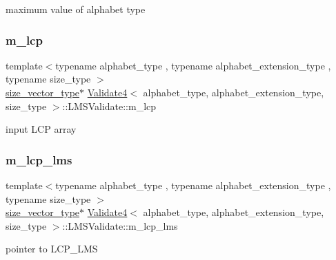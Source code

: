 maximum value of alphabet type 

\mbox{\label{struct_validate4_1_1_l_m_s_validate_a1618db621ffc7cc9265df07c08b58b93}} 
\subsubsection{\texorpdfstring{m\+\_\+lcp}{m\_lcp}}
{\footnotesize\ttfamily template$<$typename alphabet\+\_\+type , typename alphabet\+\_\+extension\+\_\+type , typename size\+\_\+type $>$ \\
\hyperlink{class_validate4_a46ea31a0a4b23f583806792160421d15}{size\+\_\+vector\+\_\+type}$\ast$ \hyperlink{class_validate4}{Validate4}$<$ alphabet\+\_\+type, alphabet\+\_\+extension\+\_\+type, size\+\_\+type $>$\+::L\+M\+S\+Validate\+::m\+\_\+lcp\hspace{0.3cm}{\ttfamily [private]}}



input L\+CP array 

\mbox{\label{struct_validate4_1_1_l_m_s_validate_a6ce0f5fd88cd24e81c85faad0c1d64d5}} 
\subsubsection{\texorpdfstring{m\+\_\+lcp\+\_\+lms}{m\_lcp\_lms}}
{\footnotesize\ttfamily template$<$typename alphabet\+\_\+type , typename alphabet\+\_\+extension\+\_\+type , typename size\+\_\+type $>$ \\
\hyperlink{class_validate4_a46ea31a0a4b23f583806792160421d15}{size\+\_\+vector\+\_\+type}$\ast$ \hyperlink{class_validate4}{Validate4}$<$ alphabet\+\_\+type, alphabet\+\_\+extension\+\_\+type, size\+\_\+type $>$\+::L\+M\+S\+Validate\+::m\+\_\+lcp\+\_\+lms\hspace{0.3cm}{\ttfamily [private]}}



pointer to L\+C\+P\+\_\+\+L\+MS 

